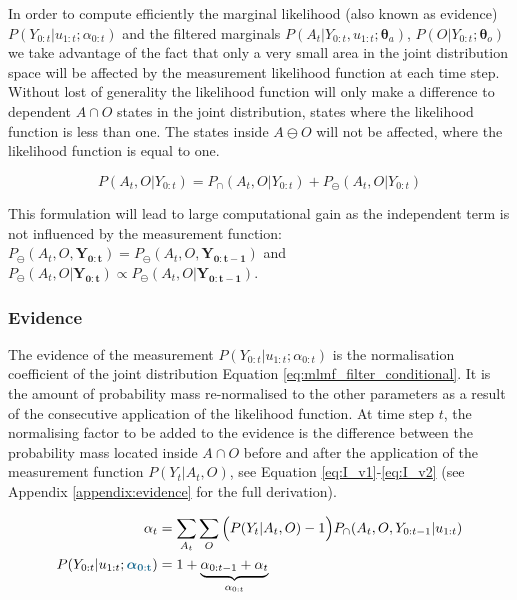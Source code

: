 \documentclass{frontiersSCNS} %
\newcommand*{\mathcolor}{}
\def\mathcolor#1#{\mathcoloraux{#1}}
\newcommand*{\mathcoloraux}[3]{%
  \protect\leavevmode
  \begingroup
    \color#1{#2}#3%
  \endgroup
}
\newcommand{\ThA}{\boldsymbol{\theta}_a}
\newcommand{\ThO}{\boldsymbol{\theta}_o}
\newcommand{\BAlph}{\boldsymbol{\alpha}_{\mathbf{0:t}}}
\begin{document}
In order to compute efficiently the marginal likelihood (also known as evidence) $P(Y_{0:t}|u_{1:t};\alpha_{0:t})$ and the filtered  marginals $P(A_t|Y_{0:t},u_{1:t};\ThA)$,
$P(O|Y_{0:t};\ThO)$ we take advantage of the fact that only a very small area 
in the joint distribution space will be affected by the measurement likelihood function at each time step.
Without lost of generality the likelihood function will only make a difference to dependent $A \cap O$ states in the joint distribution, states 
where the likelihood function is less than one. The states inside $A \ominus O$ will not be affected, where the likelihood function 
is equal to one.

\begin{equation}\label{eq:joint_independent_dependent}
 P(A_t,O|Y_{0:t}) = P_{\cap}(A_t,O|Y_{0:t}) + P_{\ominus}(A_t,O|Y_{0:t})
\end{equation}

This formulation will lead to large computational gain as the independent term is not influenced by the measurement function: 
${P_{\ominus}(A_t,O,\mathbf{Y_{0:t}}) = P_{\ominus}(A_t,O,\mathbf{Y_{0:t-1}})}$ and 
${P_{\ominus}(A_t,O|\mathbf{Y_{0:t}}) \propto P_{\ominus}(A_t,O|\mathbf{Y_{0:t-1}})}$.

\subsubsection{Evidence}

The evidence of the measurement $P(Y_{0:t}|u_{1:t};\alpha_{0:t})$ is the normalisation coefficient of the joint distribution Equation \ref{eq:mlmf_filter_conditional}.
It is the amount of probability mass re-normalised to the other parameters as a result of the consecutive application of the likelihood function.
At time step $t$, the normalising factor to be added to the evidence is the difference between the probability mass located 
inside $A\cap O$ before and after the application of the measurement function $P(Y_t|A_t,O)$, 
see Equation \ref{eq:I_v1}-\ref{eq:I_v2} (see Appendix \ref{appendix:evidence} for the full derivation).

\begin{align}
 \alpha_t 			 	&= \sum\limits_{A_t}\sum\limits_{O} \Big(P(Y_t|A_t,O) - 1\Big)P_{\cap}(A_t,O,Y_{0:t-1}|u_{1:t}) \label{eq:I_v1} \\
 P(Y_{0:t}|u_{1:t};\mathcolor{dark-blue}{\BAlph})        &= 1 + \underbrace{\alpha_{0:t-1} + \alpha_t}_{\alpha_{0:t}} \label{eq:I_v2}
\end{align}
\end{document}
